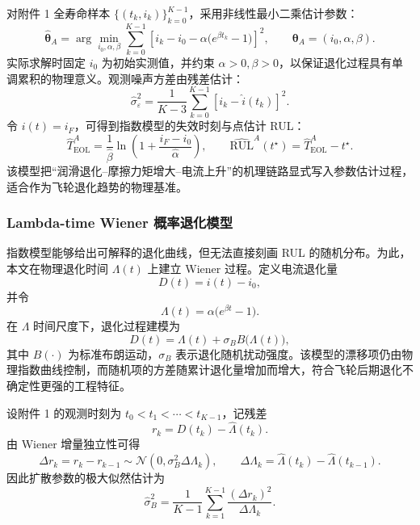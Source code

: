 对附件 1 全寿命样本 $\{(t_k,i_k)\}_{k=0}^{K-1}$，采用非线性最小二乘估计参数：
\begin{equation}
  \label{eq:q1_nlls}
  \hat{\boldsymbol\theta}_A
  =
  \arg\min_{i_0,\alpha,\beta}
  \sum_{k=0}^{K-1}
  \left[
    i_k-i_0-\alpha\bigl(e^{\beta t_k}-1\bigr)
  \right]^2,
  \qquad
  \boldsymbol\theta_A=(i_0,\alpha,\beta).
\end{equation}
实际求解时固定 $i_0$ 为初始实测值，并约束 $\alpha>0,\beta>0$，以保证退化过程具有单调累积的物理意义。观测噪声方差由残差估计：
\begin{equation}
  \label{eq:q1_sigma_eps}
  \hat\sigma_\varepsilon^2
  =
  \frac{1}{K-3}
  \sum_{k=0}^{K-1}
  \left[
    i_k-\hat i(t_k)
  \right]^2 .
\end{equation}
令 $i(t)=i_F$，可得到指数模型的失效时刻与点估计 RUL：
\begin{equation}
  \label{eq:q1_exp_eol}
  \hat T_{\mathrm{EOL}}^A
  =
  \frac{1}{\hat\beta}
  \ln\left(1+\frac{i_F-i_0}{\hat\alpha}\right),
  \qquad
  \widehat{\mathrm{RUL}}^A(t^\star)=\hat T_{\mathrm{EOL}}^A-t^\star .
\end{equation}
该模型把“润滑退化--摩擦力矩增大--电流上升”的机理链路显式写入参数估计过程，适合作为飞轮退化趋势的物理基准。

\subsubsection{Lambda-time Wiener 概率退化模型}

指数模型能够给出可解释的退化曲线，但无法直接刻画 RUL 的随机分布。为此，本文在物理退化时间 $\Lambda(t)$ 上建立 Wiener 过程。定义电流退化量
\begin{equation}
  \label{eq:q1_degradation_amount}
  D(t)=i(t)-i_0,
\end{equation}
并令
\begin{equation}
  \label{eq:q1_lambda}
  \Lambda(t)=\alpha\bigl(e^{\beta t}-1\bigr).
\end{equation}
在 $\Lambda$ 时间尺度下，退化过程建模为
\begin{equation}
  \label{eq:q1_lambda_wiener}
  D(t)=\Lambda(t)+\sigma_B B\bigl(\Lambda(t)\bigr),
\end{equation}
其中 $B(\cdot)$ 为标准布朗运动，$\sigma_B$ 表示退化随机扰动强度。该模型的漂移项仍由物理指数曲线控制，而随机项的方差随累计退化量增加而增大，符合飞轮后期退化不确定性更强的工程特征。

设附件 1 的观测时刻为 $t_0<t_1<\cdots<t_{K-1}$，记残差
\begin{equation}
  r_k=D(t_k)-\hat\Lambda(t_k).
\end{equation}
由 Wiener 增量独立性可得
\begin{equation}
  \label{eq:q1_lambda_increment}
  \Delta r_k=r_k-r_{k-1}
  \sim
  \mathcal N\left(0,\sigma_B^2\Delta\Lambda_k\right),
  \qquad
  \Delta\Lambda_k=\hat\Lambda(t_k)-\hat\Lambda(t_{k-1}).
\end{equation}
因此扩散参数的极大似然估计为
\begin{equation}
  \label{eq:q1_sigma_b_mle}
  \hat\sigma_B^2
  =
  \frac{1}{K-1}
  \sum_{k=1}^{K-1}
  \frac{(\Delta r_k)^2}{\Delta\Lambda_k}.
\end{equation}

